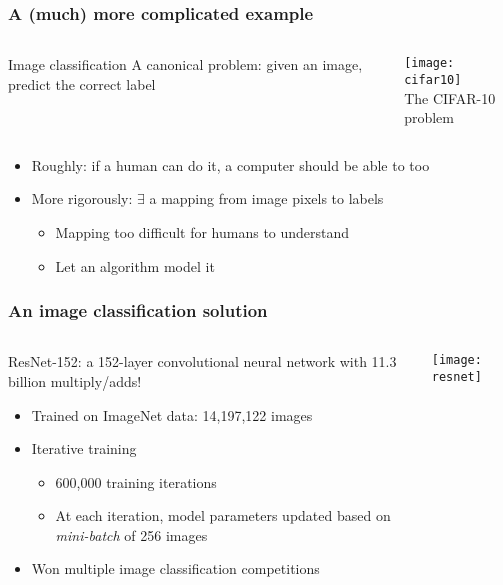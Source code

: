 \begin{frame}
    \frametitle{A (much) more complicated example}
    \begin{columns}
        \begin{column}{0.37\textwidth}
            \begin{block}{Image classification}
                A canonical problem: given an image, predict the correct label
            \end{block}
        \end{column}
        \begin{column}{0.63\textwidth}
            \texttt{[image: cifar10]} \\
            \centering \footnotesize The CIFAR-10 problem
        \end{column}
    \end{columns}

    \begin{itemize}
        \item Roughly: if a human can do it, a computer should be able to too
        \item More rigorously: $\exists$ a mapping from image pixels to labels
        \begin{itemize}
            \item Mapping too difficult for humans to understand
            \item Let an algorithm model it
        \end{itemize}
    \end{itemize}
\end{frame}

\begin{frame}
    \frametitle{An image classification solution}

    \begin{columns}
        \begin{column}{0.7\textwidth}
            ResNet-152: a 152-layer convolutional neural network with 11.3 billion multiply/adds! \citep{He15b}
            \begin{itemize}
                \item Trained on ImageNet data: 14,197,122 images
                \item Iterative training
                \begin{itemize}
                    \item 600,000 training iterations
                    \item At each iteration, model parameters updated based on \emph{mini-batch} of 256 images
                \end{itemize}
                \item Won multiple image classification competitions
            \end{itemize}
        \end{column}
        \begin{column}{0.3\textwidth}
            \texttt{[image: resnet]}
        \end{column}
    \end{columns}
\end{frame}

